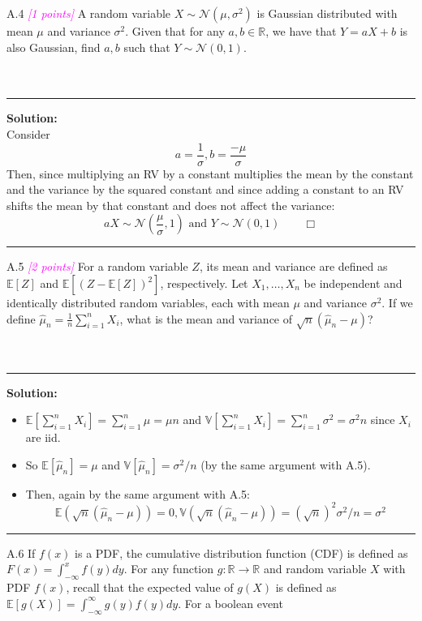 \documentclass{article}
\newcommand{\field}[1]{\mathbb{#1}}
\newcommand{\1}{\mathbf{1}}
\newcommand{\E}{\mathbb{E}}
\newcommand{\V}{\mathbb{V}}
\newcommand{\R}{\field{R}} %
\newcommand{\points}[1]{\small\textcolor{magenta}{\emph{[#1 points]}} \normalsize}
\begin{document}
A.4 \points{1} A random variable $X \sim \mathcal{N}(\mu, \sigma^2)$ is Gaussian distributed with mean $\mu$ and variance $\sigma^2$. Given that for any $a,b \in \R$, we have that $Y = aX + b$ is also Gaussian, find $a,b$ such that $Y \sim \mathcal{N}(0,1)$.\\
\\
\\
    \noindent\rule{\textwidth}{1pt}
    {\bf Solution:}\\
    Consider $$\boxed{a = \frac{1}{\sigma}, b = \frac{-\mu}{\sigma}}$$ 
    Then, since multiplying an RV by a constant multiplies the mean by the constant and the variance by the squared constant and since adding a constant to an RV shifts the mean by that constant and does not affect the variance:
    $$
    aX \sim \mathcal{N}(\frac{\mu}{\sigma}, 1) \text{  and  } Y \sim \mathcal{N}(0,1) \qquad \Box
    $$
    \noindent\rule{\textwidth}{1pt}
A.5 \points{2} For a random variable $Z$, its mean and variance are defined as $\E[Z]$ and $\E[(Z-\E[Z])^2]$, respectively.
Let $X_1,\dots,X_n$ be independent and identically distributed random variables, each with mean $\mu$ and variance $\sigma^2$. 
If we define $\widehat{\mu}_n = \frac{1}{n} \sum_{i=1}^n X_i$, what is the mean and variance of $\sqrt{n}(\widehat{\mu}_n - \mu)$?\\
\\
\\
    \noindent\rule{\textwidth}{1pt}
    {\bf Solution:}\\
    \begin{itemize}
    \item $\E[\sum_{i=1}^n X_i] = \sum_{i=1}^n \mu = \mu n$ and $\V[\sum_{i=1}^n X_i] = \sum_{i=1}^n \sigma^2 = \sigma^2 n$ since $X_i$ are iid.
    
    \item So $\E[\widehat{\mu}_n] = \mu$ and $\V[\widehat{\mu}_n] = \sigma^2/n$ (by the same argument with A.5).
    \item Then, again by the same argument with A.5: $$\boxed{\E(\sqrt{n}(\widehat{\mu}_n - \mu)) = 0, \V(\sqrt{n}(\widehat{\mu}_n - \mu)) = (\sqrt{n})^2\sigma^2/n = \sigma^2}$$
    \end{itemize}
    \noindent\rule{\textwidth}{1pt}
A.6 If $f(x)$ is a PDF, the cumulative distribution function (CDF)
  is  defined as $F(x) = \int_{-\infty}^x f(y) dy$.  For any function
  $g : \R \rightarrow \R$ and random variable $X$ with PDF $f(x)$,
  recall that the expected value of $g(X)$ is defined as
  $\E[g(X)] = \int_{-\infty}^\infty g(y) f(y) dy$. For a boolean event
\end{document}
